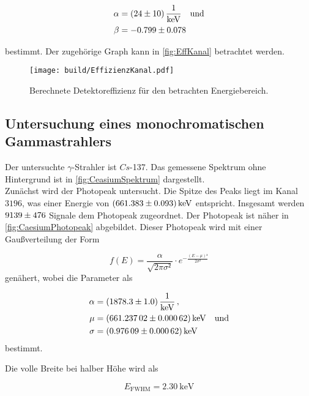 \begin{align*}
    \alpha &= \SI{24 \pm 10}{\frac{1}{\kilo\eV}} \quad  \text{und} \\
    \beta  &= \num{-0.799 \pm 0.078}\\
\end{align*}
%

bestimmt.
Der zugehörige Graph kann in \autoref{fig:EffKanal} betrachtet werden.


\begin{figure}[H]
    \centering
    \texttt{[image: build/EffizienzKanal.pdf]}
    \caption{Berechnete Detektoreffizienz für den betrachten Energiebereich.}
    \label{fig:EffKanal}
\end{figure}

\subsection{Untersuchung eines monochromatischen Gammastrahlers}

Der untersuchte $\gamma$-Strahler ist $Cs$-137.
Das gemessene Spektrum ohne Hintergrund ist in \autoref{fig:CeasiumSpektrum} dargestellt.\\
Zunächst wird der Photopeak untersucht.
Die Spitze des Peaks liegt im Kanal $3196$, was einer Energie von $\SI{661.383 \pm 0.093}{\kilo\eV}$ entspricht.
Insgesamt werden $\num{9139 \pm 476}$ Signale dem Photopeak zugeordnet.
Der Photopeak ist näher in \autoref{fig:CaesiumPhotopeak} abgebildet. 
Dieser Photopeak wird mit einer Gaußverteilung der Form

\begin{equation*}
    f(E) = \frac{\alpha}{\sqrt{2 \pi \sigma²}} \cdot e^{-\frac{(E-\mu)²}{2 \sigma²}}
\end{equation*}
genähert, wobei die Parameter als 

\begin{align*}
    \alpha  &= \SI{1878.3 \pm 1.0}{\frac{1}{\kilo\eV}} \,, \\
    \mu     &= \SI{661.23702 \pm 0.00062}{\kilo\eV}   \quad  \text{und}             \\
    \sigma  &= \SI{0.97609 \pm 0.00062}{\kilo\eV}\\
\end{align*}
bestimmt.

Die volle Breite bei halber Höhe wird als

\begin{equation*}
    E_{\text{FWHM}} =  \SI{2.30}{\kilo\eV}
\end{equation*}

